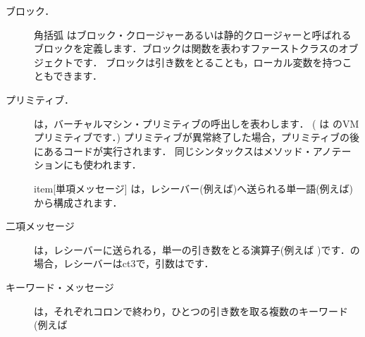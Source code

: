 \documentclass[a4paper,10pt,twoside]{book}
\begin{document}
\begin{description}
\item[ブロック．] 角括弧 \ct{[ ]} はブロック・クロージャーあるいは静的クロージャーと呼ばれるブロックを定義します．ブロックは関数を表わすファーストクラスのオブジェクトです．
	ブロックは引き数をとることも，ローカル変数を持つこともできます．

\item[プリミティブ．] は，バーチャルマシン・プリミティブの呼出しを表わします．
	( は のVMプリミティブです．)
	プリミティブが異常終了した場合，プリミティブの後にあるコードが実行されます．
	同じシンタックスはメソッド・アノテーションにも使われます．

item[単項メッセージ] は，レシーバー(例えば)へ送られる単一語(例えば)から構成されます．

\item[二項メッセージ] は，レシーバーに送られる，単一の引き数をとる演算子(例えば \ct{+})です．の場合，レシーバーはct{3}で，引数はです．

\item[キーワード・メッセージ]は，それぞれコロンで終わり，ひとつの引き数を取る複数のキーワード(例えば 
\end{description}
\end{document}

